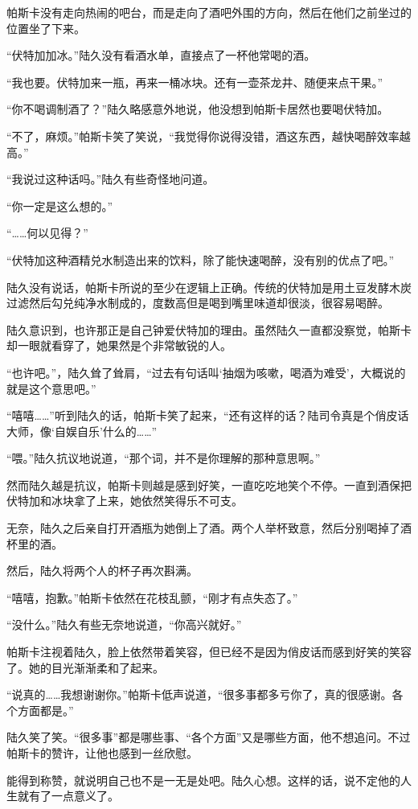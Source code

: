 帕斯卡没有走向热闹的吧台，而是走向了酒吧外围的方向，然后在他们之前坐过的位置坐了下来。

“伏特加加冰。”陆久没有看酒水单，直接点了一杯他常喝的酒。

“我也要。伏特加来一瓶，再来一桶冰块。还有一壶茶龙井、随便来点干果。” 

“你不喝调制酒了？”陆久略感意外地说，他没想到帕斯卡居然也要喝伏特加。

“不了，麻烦。”帕斯卡笑了笑说，“我觉得你说得没错，酒这东西，越快喝醉效率越高。”

“我说过这种话吗。”陆久有些奇怪地问道。

“你一定是这么想的。”

“……何以见得？”

“伏特加这种酒精兑水制造出来的饮料，除了能快速喝醉，没有别的优点了吧。”

陆久没有说话，帕斯卡所说的至少在逻辑上正确。传统的伏特加是用土豆发酵木炭过滤然后勾兑纯净水制成的，度数高但是喝到嘴里味道却很淡，很容易喝醉。

陆久意识到，也许那正是自己钟爱伏特加的理由。虽然陆久一直都没察觉，帕斯卡却一眼就看穿了，她果然是个非常敏锐的人。

“也许吧。”，陆久耸了耸肩，“过去有句话叫‘抽烟为咳嗽，喝酒为难受’，大概说的就是这个意思吧。”

“嘻嘻……”听到陆久的话，帕斯卡笑了起来，“还有这样的话？陆司令真是个俏皮话大师，像‘自娱自乐’什么的……”

“喂。”陆久抗议地说道，“那个词，并不是你理解的那种意思啊。”

然而陆久越是抗议，帕斯卡则越是感到好笑，一直吃吃地笑个不停。一直到酒保把伏特加和冰块拿了上来，她依然笑得乐不可支。

无奈，陆久之后亲自打开酒瓶为她倒上了酒。两个人举杯致意，然后分别喝掉了酒杯里的酒。

然后，陆久将两个人的杯子再次斟满。

“嘻嘻，抱歉。”帕斯卡依然在花枝乱颤，“刚才有点失态了。”

“没什么。”陆久有些无奈地说道，“你高兴就好。”

帕斯卡注视着陆久，脸上依然带着笑容，但已经不是因为俏皮话而感到好笑的笑容了。她的目光渐渐柔和了起来。

“说真的……我想谢谢你。”帕斯卡低声说道，“很多事都多亏你了，真的很感谢。各个方面都是。”

陆久笑了笑。“很多事”都是哪些事、“各个方面”又是哪些方面，他不想追问。不过帕斯卡的赞许，让他也感到一丝欣慰。

能得到称赞，就说明自己也不是一无是处吧。陆久心想。这样的话，说不定他的人生就有了一点意义了。


